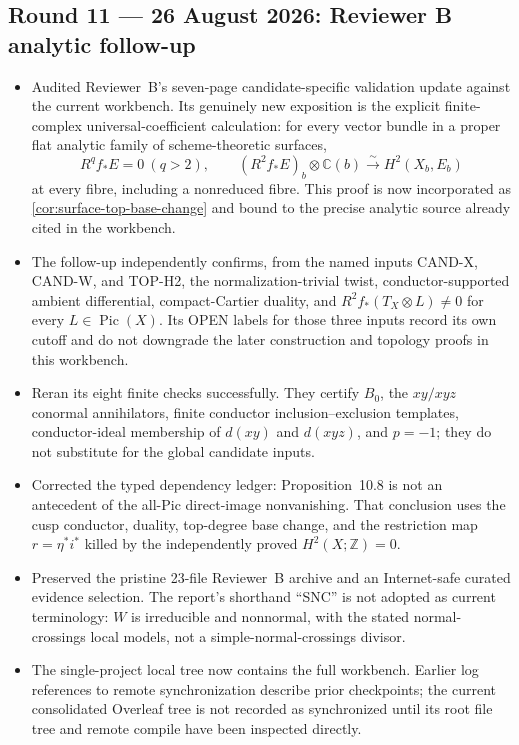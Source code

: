 \subsection*{Round 11 --- 26 August 2026: Reviewer B analytic follow-up}

\begin{itemize}[leftmargin=1.8em]
\item Audited Reviewer~B's seven-page candidate-specific validation update
against the current workbench.  Its genuinely new exposition is the explicit
finite-complex universal-coefficient calculation: for every vector bundle in
a proper flat analytic family of scheme-theoretic surfaces,
\[
R^qf_*E=0\ (q>2),\qquad
(R^2f_*E)_b\otimes\mathbb C(b)\xrightarrow{\sim}H^2(X_b,E_b)
\]
at every fibre, including a nonreduced fibre.  This proof is now incorporated
as \cref{cor:surface-top-base-change} and bound to the precise analytic
source already cited in the workbench.
\item The follow-up independently confirms, from the named inputs CAND-X,
CAND-W, and TOP-H2, the normalization-trivial twist, conductor-supported
ambient differential, compact-Cartier duality, and
$R^2f_*(T_X\otimes L)\ne0$ for every $L\in\operatorname{Pic}(X)$.  Its
OPEN labels for those three inputs record its own cutoff and do not downgrade
the later construction and topology proofs in this workbench.
\item Reran its eight finite checks successfully.  They certify $B_0$, the
$xy/xyz$ conormal annihilators, finite conductor inclusion--exclusion
templates, conductor-ideal membership of $d(xy)$ and $d(xyz)$, and $p=-1$;
they do not substitute for the global candidate inputs.
\item Corrected the typed dependency ledger: Proposition~10.8 is not an
antecedent of the all-Pic direct-image nonvanishing.  That conclusion uses the
cusp conductor, duality, top-degree base change, and the restriction map
$r=\eta^*i^*$ killed by the independently proved $H^2(X;\mathbb Z)=0$.
\item Preserved the pristine 23-file Reviewer~B archive and an Internet-safe
curated evidence selection.  The report's shorthand ``SNC'' is not adopted
as current terminology: $W$ is irreducible and nonnormal, with the stated
normal-crossings local models, not a simple-normal-crossings divisor.
\item The single-project local tree now contains the full workbench.  Earlier
log references to remote synchronization describe prior checkpoints; the
current consolidated Overleaf tree is not recorded as synchronized until its
root file tree and remote compile have been inspected directly.
\end{itemize}

